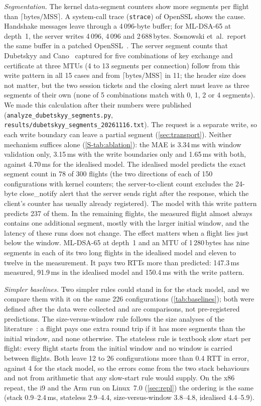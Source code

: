 \documentclass[preprint,12pt]{elsarticle}
\newcommand{\ms}{\,ms\xspace}
\begin{document}
\emph{Segmentation.} The kernel data-segment counters show more segments per flight than $\lceil\text{bytes}/\mathrm{MSS}\rceil$. A system-call trace (\texttt{strace}) of OpenSSL shows the cause. Handshake messages leave through a 4\,096-byte buffer; for ML-DSA-65 at depth~1, the server writes 4\,096, 4\,096 and 2\,688\,bytes. Sosnowski et~al.\ report the same buffer in a patched OpenSSL~\cite{sosnowski2023}. The server segment counts that Dubetskyy and Cano~\cite{dubetskyy2026} captured for five combinations of key exchange and certificate at three MTUs (4 to 13 segments per connection) follow from this write pattern in all 15 cases and from $\lceil\text{bytes}/\mathrm{MSS}\rceil$ in 11; the header size does not matter, but the two session tickets and the closing alert must leave as three segments of their own (none of 5 combinations match with 0, 1, 2 or 4 segments). We made this calculation after their numbers were published (\texttt{analyze\_dubetskyy\_segments.py}, \texttt{results/dubetskyy\_segments\_20261116.txt}). The request is a separate write, so each write boundary can leave a partial segment (\cref{sec:transport}). Neither mechanism suffices alone (\cref{S-tab:ablation}): the MAE is 3.34\ms with window validation only, 3.15\ms with the write boundaries only and 1.65\ms with both, against 4.70\ms for the idealised model. The idealised model predicts the exact segment count in 78 of 300 flights (the two directions of each of 150 configurations with kernel counters; the server-to-client count excludes the 24-byte close\_notify alert that the server sends right after the response, which the client's counter has usually already registered). The model with this write pattern predicts 237 of them. In the remaining flights, the measured flight almost always contains one additional segment, mostly with the larger initial window, and the latency of these runs does not change. The effect matters when a flight lies just below the window. ML-DSA-65 at depth~1 and an MTU of 1\,280\,bytes has nine segments in each of its two long flights in the idealised model and eleven to twelve in the measurement. It pays two RTTs more than predicted: 147.3\ms measured, 91.9\ms in the idealised model and 150.4\ms with the write pattern.

\emph{Simpler baselines.} Two simpler rules could stand in for the stack model, and we compare them with it on the same 226 configurations (\cref{tab:baselines}); both were defined after the data were collected and are comparisons, not pre-registered predictions. The size-versus-window rule follows the size analyses of the literature~\cite{kampanakis2022}: a flight pays one extra round trip if it has more segments than the initial window, and none otherwise. The stateless rule is textbook slow start per flight: every flight starts from the initial window and no window is carried between flights. Both leave 12 to 26 configurations more than 0.4 RTT in error, against 4 for the stack model, so the errors come from the two stack behaviours and not from arithmetic that any slow-start rule would supply. On the x86 repeat, the i9 and the Arm run on Linux~7.0 (\cref{sec:repl}) the ordering is the same (stack 0.9--2.4\ms, stateless 2.9--4.4, size-versus-window 3.8--4.8, idealised 4.4--5.9).
\end{document}
